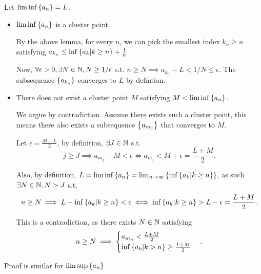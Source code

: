 \noindent Let $\liminf\left\{a_n\right\} = L$.
\begin{itemize}
    \item $\liminf\left\{a_n\right\}$ is a cluster point.
    
    By the above lemma, for every $n$, we can pick the smallest index $k_n \geq n$ satisfying $a_{k_n} \leq \inf\left\{a_k | k \geq n\right\} + \frac{1}{n}$
    
    Now, $\forall \epsilon > 0, \exists N \in \mathbb{N}, N\geq 1/\epsilon$ s.t. $n \geq N \implies a_{k_n} - L < 1/N \leq \epsilon.$
    The subsequence $\left\{a_{k_n}\right\}$ converges to $L$ by defintion.
    
    \item There does not exist a cluster point $M$ satisfying $M < \liminf\left\{a_n\right\}$.
    
    We argue by contradiction. Assume there exists such a cluster point, this means there also exists a subsequence $\left\{a_{m_j}\right\}$ that converges to $M$.

    Let $\epsilon = \frac{M-L}{2}$, by definition, $\exists J \in \mathbb{N}$ s.t. 
    \[j \geq J \implies a_{m_j} - M < \epsilon \iff a_{m_j} < M + \epsilon = \frac{L+M}{2}.\]

    Also, by definition, $L = \liminf\left\{a_n\right\} = \lim_{n\to\infty} \left\{\inf\left\{a_k | k \geq n\right\}\right\}$, as such $\exists N \in \mathbb{N}, N > J$ s.t. 
    \[n \geq N \implies L - \inf\left\{a_k | k \geq n\right\} < \epsilon \iff \inf\left\{a_k | k \geq n\right\} > L - \epsilon = \frac{L + M}{2}.\]

    This is a contradiction, as there exists $N \in \mathbb{N}$ satisfying
    \[ n \geq N \implies \begin{cases}
        a_{m_n} < \frac{L+M}{2} \\ \inf\left\{a_k | k > n\right\} \geq \frac{L+M}{2}
    \end{cases}.\]
\end{itemize}
Proof is similar for $\limsup\left\{a_n\right\}$

